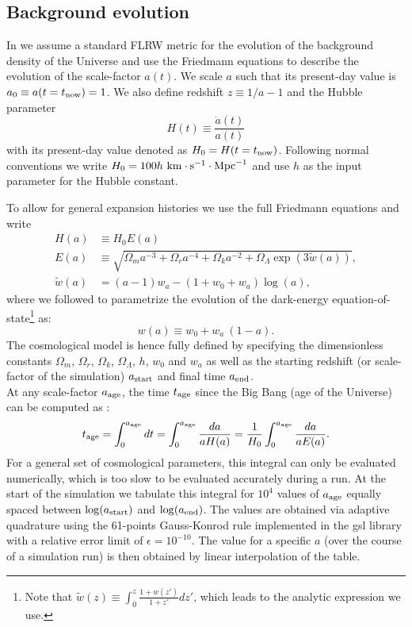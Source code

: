 \subsection{Background evolution}
\label{ssec:flrw}

In \swift we assume a standard FLRW metric for the evolution of the background
density of the Universe and use the Friedmann equations to describe the
evolution of the scale-factor $a(t)$.  We scale $a$ such that its present-day
value is $a_0 \equiv a(t=t_{\rm now}) = 1$. We also define redshift $z \equiv
1/a - 1$ and the Hubble parameter
\begin{equation}
H(t) \equiv \frac{\dot{a}(t)}{a(t)}
\end{equation}
with its present-day value denoted as $H_0 = H(t=t_{\rm now})$. Following
normal conventions we write $H_0 = 100
h~\rm{km}\cdot\rm{s}^{-1}\cdot\rm{Mpc}^{-1}$ and use $h$ as the input parameter
for the Hubble constant.

To allow for general expansion histories we use the full Friedmann equations
and write
\begin{align}
H(a) &\equiv H_0 E(a) \\ E(a) &\equiv\sqrt{\Omega_m a^{-3} + \Omega_r
  a^{-4} + \Omega_k a^{-2} + \Omega_\Lambda \exp\left(3\tilde{w}(a)\right)},
\\
\tilde{w}(a) &= (a-1)w_a - (1+w_0 + w_a)\log\left(a\right),
\label{eq:friedmann}
\end{align}
where we followed \cite{Linder2003} to parametrize the evolution of
the dark-energy equation-of-state\footnote{Note that $\tilde{w}(z)\equiv
  \int_0^z \frac{1+w(z')}{1+z'}dz'$, which leads to the analytic
  expression we use.} as:
\begin{equation}
w(a) \equiv w_0 + w_a~(1-a).
\end{equation}
The cosmological model is hence fully defined by specifying the dimensionless
constants $\Omega_m$, $\Omega_r$, $\Omega_k$, $\Omega_\Lambda$, $h$, $w_0$ and
$w_a$ as well as the starting redshift (or scale-factor of the simulation)
$a_{\rm start}$ and final time $a_{\rm end}$. \\ At any scale-factor $a_{\rm
age}$, the time $t_{\rm age}$ since the Big Bang (age of the Universe) can be
computed as \citep[e.g.][]{Wright2006}:
\begin{equation}
  t_{\rm age} = \int_{0}^{a_{\rm age}} dt = \int_{0}^{a_{\rm age}}
  \frac{da}{a H(a)} = \frac{1}{H_0} \int_{0}^{a_{\rm age}}
  \frac{da}{a E(a)}. \label{eq:flrw:age}
\end{equation}
For a general set of cosmological parameters, this integral can only be
evaluated numerically, which is too slow to be evaluated accurately during a
run. At the start of the simulation we tabulate this integral for $10^4$ values
of $a_{\rm age}$ equally spaced between $\log(a_{\rm start})$ and $\log(a_{\rm
end})$. The values are obtained via adaptive quadrature using the 61-points
Gauss-Konrod rule implemented in the {\sc gsl} library \citep{GSL} with a
relative error limit of $\epsilon=10^{-10}$. The value for a specific $a$ (over
the course of a simulation run) is then obtained by linear interpolation of the
table.

